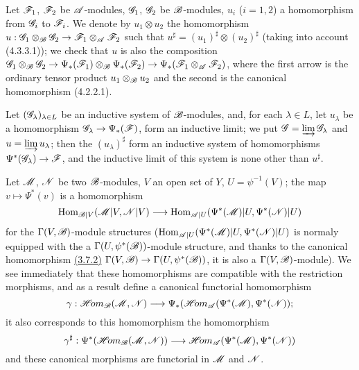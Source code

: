 \begin{env}[4.4.4]
\label{env-0.4.4.4}
Let $\mathscr{F}_1$, $\mathscr{F}_2$ be $\mathscr{A}$-modules, $\mathscr{G}_1$, $\mathscr{G}_2$ be $\mathscr{B}$-modules,
$u_i$ ($i=1,2$) a homomorphism from $\mathscr{G}_i$ to $\mathscr{F}_i$. We denote by $u_1\otimes u_2$
the homomorphism $u:\mathscr{G}_1\otimes_\mathscr{B}\mathscr{G}_2\to\mathscr{F}_1\otimes_\mathscr{A}\mathscr{F}_2$ such
that $u^\sharp=(u_1)^\sharp\otimes(u_2)^\sharp$ (taking into account (4.3.3.1)); we check
that $u$ is also the composition
$\mathscr{G}_1\otimes_\mathscr{B}\mathscr{G}_2\to\Psi_*(\mathscr{F}_1)\otimes_\mathscr{B}\Psi_*(\mathscr{F}_2)
\to\Psi_*(\mathscr{F}_1\otimes_\mathscr{A}\mathscr{F}_2)$, where the first arrow is the ordinary tensor
product $u_1\otimes_\mathscr{B}u_2$ and the second is the canonical homomorphism (4.2.2.1).
\end{env}

\begin{env}[4.4.5]
\label{env-0.4.4.5}
Let $(\mathscr{G}_\lambda)_{\lambda\in L}$ be an inductive system of
$\mathscr{B}$-modules, and, for each $\lambda\in L$, let $u_\lambda$ be a
homomorphism $\mathscr{G}_\lambda\to\Psi_*(\mathscr{F})$, form an inductive limit; we put
$\mathscr{G}=\varinjlim\mathscr{G}_\lambda$ and $u=\varinjlim u_\lambda$; then the
$(u_\lambda)^\sharp$ form an inductive system of homomorphisms
$\Psi^*(\mathscr{G}_\lambda)\to\mathscr{F}$, and the inductive limit of this system is
none other than $u^\sharp$.
\end{env}

\begin{env}[4.4.6]
\label{env-0.4.4.6}
Let $\mathscr{M}$, $\mathscr{N}$ be two $\mathscr{B}$-modules, $V$ an open set of $Y$,
$U=\psi^{-1}(V)$; the map $v\mapsto\Psi^*(v)$ is a homomorphism
\[
  {\mathop{\mathrm{Hom}}\nolimits}_{\mathscr{B}|V}(\mathscr{M}|V,\mathscr{N}|V)
  \longrightarrow{\mathop{\mathrm{Hom}}\nolimits}_{\mathscr{A}|U}(\Psi^*(\mathscr{M})|U,\Psi^*(\mathscr{N})|U)
\]
for the $\Gamma(V,\mathscr{B})$-module structures
(${\mathop{\mathrm{Hom}}\nolimits}_{\mathscr{A}|U}(\Psi^*(\mathscr{M})|U,\Psi^*(\mathscr{N})|U)$ is normaly equipped with the a
$\Gamma(U,\psi^*(\mathscr{B}))$-module structure, and thanks to the canonical homomorphism
\hyperref[env-0.3.7.2]{(3.7.2)} $\Gamma(V,\mathscr{B})\to\Gamma(U,\psi^*(\mathscr{B}))$, it is also a
$\Gamma(V,\mathscr{B})$-module). We see immediately that these homomorphisms are compatible with
the restriction morphisms, and as a result define a canonical functorial homomorphism
\[
  \gamma:\mathscr{H}\!{om}_\mathscr{B}(\mathscr{M},\mathscr{N})
  \longrightarrow\Psi_*(\mathscr{H}\!{om}_\mathscr{A}(\Psi^*(\mathscr{M}),\Psi^*(\mathscr{N}));
\]
it also corresponds to this homomorphism the homomorphism
\[
  \gamma^\sharp:\Psi^*(\mathscr{H}\!{om}_\mathscr{B}(\mathscr{M},\mathscr{N}))
  \longrightarrow\mathscr{H}\!{om}_\mathscr{A}(\Psi^*(\mathscr{M}),\Psi^*(\mathscr{N}))
\]
and these canonical morphisms are functorial in $\mathscr{M}$ and $\mathscr{N}$.
\end{env}

